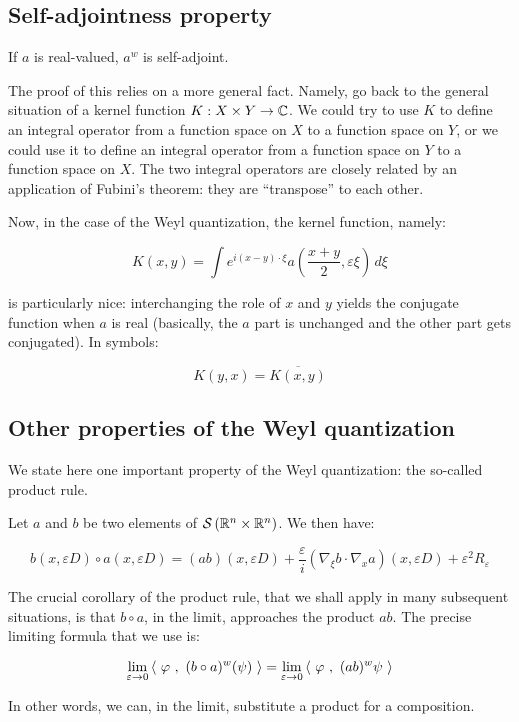 \documentclass[a4paper]{amsart}
\newcommand{\schwarz}[1]{\mathcal{S}\left(#1\right)}
\begin{document}
\subsection{Self-adjointness property}

If $a$ is real-valued, $a^w$ is self-adjoint.

The proof of this relies on a more general fact. Namely, go back to
the general situation of a kernel function $K: X \times Y \to \mathbb{C}$. We
could try to use $K$ to define an integral operator from a function
space on $X$ to a function space on $Y$, or we could use it to define
an integral operator from a function space on $Y$ to a function space
on $X$. The two integral operators are closely related by an
application of Fubini's theorem: they are ``transpose'' to each other.

Now, in the case of the Weyl quantization, the kernel function, namely:

$$K(x,y) = \int e^{i(x - y) \cdot \xi} a\left(\frac{x+y}{2}, \varepsilon \xi \right)\, d\xi$$

is particularly nice: interchanging the role of $x$ and $y$ yields the
conjugate function when $a$ is real (basically, the $a$ part is
unchanged and the other part gets conjugated). In symbols:

$$K(y,x) = \overline{K(x,y)}$$

\subsection{Other properties of the Weyl quantization}

We state here one important property of the Weyl quantization: the
so-called product rule.

Let $a$ and $b$ be two elements of $\schwarz{\R^n \times \R^n}$. We then have:

$$b(x,\varepsilon D) \circ a(x,\varepsilon D) = (ab)(x,\varepsilon D) + \frac{\varepsilon}{i} \left(\nabla_\xi b \cdot \nabla_x a \right)(x,\varepsilon D) + \varepsilon^2 R_\varepsilon$$

The crucial corollary of the product rule, that we shall apply in many
subsequent situations, is that $b \circ a$, in the limit, approaches
the product $ab$. The precise limiting formula that we use is:

$$\lim_{\varepsilon \to 0} \left< \ \varphi \ , \ (b \circ a)^w(\psi) \ \right> = \lim_{\varepsilon \to 0} \left< \ \varphi \ , \ (ab)^w \psi \ \right>$$

In other words, we can, in the limit, substitute a product for a composition.
\end{document}
